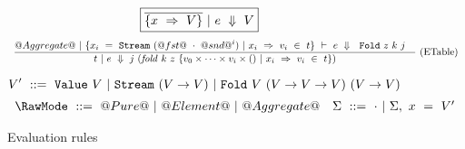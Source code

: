 \begin{figure*}
$$
\boxed{\overline{\{x~\Rightarrow~V\}}~|~e~\Downarrow~V}
$$
$$
\enskip \frac {\displaystyle 
  @Aggregate@~|~\{x_i~=~\texttt{Stream}~(@fst@~\cdot~@snd@^i)~|~x_i~\Rightarrow~v_i~\in~t\}~\vdash~e~\Downarrow~~\texttt{Fold}~z~k~j
  \quad
} {\displaystyle 
  t~|~e~\Downarrow~
  j~(\mathit{fold}~k~z~\{v_0 \times \cdots \times v_i \times ()~|~x_i~\Rightarrow~v_i~\in~t\})
} \  \mbox{(ETable)} \enskip
$$

$$
V'~::=~\VValue{V}~|~\VStream{(V \to V)}~|~\VFold{V}{(V \to V \to V)}{(V \to V)}
$$
$$
\begin{array}{ll}

\RawMode~::=~@Pure@~|~@Element@~|~@Aggregate@

&

\Sigma~::=~\cdot~|~\Sigma,~x~=~V'

\end{array}
$$


\caption{Evaluation rules}
\label{fig:source:eval}
\end{figure*}


